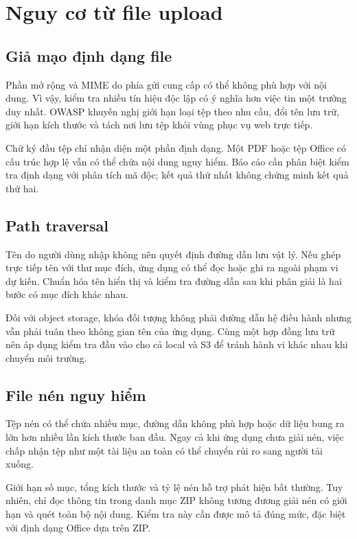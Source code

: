 \section{Nguy cơ từ file upload}
\subsection{Giả mạo định dạng file}
Phần mở rộng và MIME do phía gửi cung cấp có thể không phù hợp với nội dung. Vì vậy, kiểm tra nhiều tín hiệu độc lập có ý nghĩa hơn việc tin một trường duy nhất. OWASP khuyến nghị giới hạn loại tệp theo nhu cầu, đổi tên lưu trữ, giới hạn kích thước và tách nơi lưu tệp khỏi vùng phục vụ web trực tiếp.\cite{upload}

Chữ ký đầu tệp chỉ nhận diện một phần định dạng. Một PDF hoặc tệp Office có cấu trúc hợp lệ vẫn có thể chứa nội dung nguy hiểm. Báo cáo cần phân biệt kiểm tra định dạng với phân tích mã độc; kết quả thứ nhất không chứng minh kết quả thứ hai.
\subsection{Path traversal}
Tên do người dùng nhập không nên quyết định đường dẫn lưu vật lý. Nếu ghép trực tiếp tên với thư mục đích, ứng dụng có thể đọc hoặc ghi ra ngoài phạm vi dự kiến. Chuẩn hóa tên hiển thị và kiểm tra đường dẫn sau khi phân giải là hai bước có mục đích khác nhau.

Đối với object storage, khóa đối tượng không phải đường dẫn hệ điều hành nhưng vẫn phải tuân theo không gian tên của ứng dụng. Cùng một hợp đồng lưu trữ nên áp dụng kiểm tra đầu vào cho cả local và S3 để tránh hành vi khác nhau khi chuyển môi trường.
\subsection{File nén nguy hiểm}
Tệp nén có thể chứa nhiều mục, đường dẫn không phù hợp hoặc dữ liệu bung ra lớn hơn nhiều lần kích thước ban đầu. Ngay cả khi ứng dụng chưa giải nén, việc chấp nhận tệp như một tài liệu an toàn có thể chuyển rủi ro sang người tải xuống.

Giới hạn số mục, tổng kích thước và tỷ lệ nén hỗ trợ phát hiện bất thường. Tuy nhiên, chỉ đọc thông tin trong danh mục ZIP không tương đương giải nén có giới hạn và quét toàn bộ nội dung. Kiểm tra này cần được mô tả đúng mức, đặc biệt với định dạng Office dựa trên ZIP.
